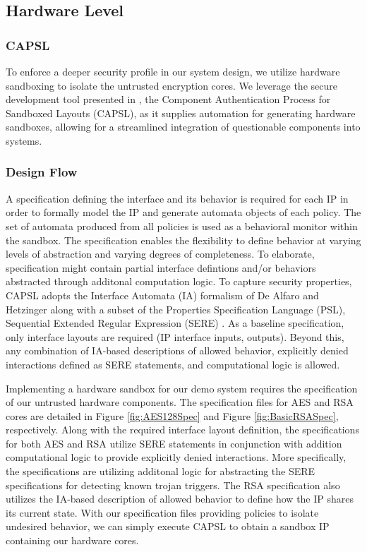 \documentclass[sigconf]{acmart}
\theoremstyle{plain}
\theoremstyle{remark}
\begin{document}
\subsection{Hardware Level}


\subsubsection{CAPSL}

To enforce a deeper security profile in our system design, we utilize hardware sandboxing to isolate the untrusted encryption cores. We leverage the secure development tool presented in \cite{CAPSL}, the Component Authentication Process for Sandboxed Layouts (CAPSL), as it supplies automation for generating hardware sandboxes, allowing for a streamlined integration of questionable components into systems.

\subsubsection{Design Flow}

A specification defining the interface and its behavior is required for each IP in order to formally model the IP and generate automata objects of each policy. The set of automata produced from all policies is used as a behavioral monitor within the sandbox. The specification enables the flexibility to define behavior at varying levels of abstraction and varying degrees of completeness. To elaborate, specification might contain partial interface defintions and/or behaviors abstracted through additonal computation logic. To capture security properties, CAPSL adopts the Interface Automata (IA) formalism of De Alfaro and Hetzinger \cite{deAlfaro} along with a subset of the Properties Specification Language (PSL), Sequential Extended Regular Expression (SERE) \cite{psl}. As a baseline specification, only interface layouts are required (IP interface inputs, outputs). Beyond this, any combination of IA-based descriptions of allowed behavior, explicitly denied interactions defined as SERE statements, and computational logic is allowed.


Implementing a hardware sandbox for our demo system requires the specification of our untrusted hardware components. The specification files for AES and RSA cores are detailed in Figure \ref{fig:AES128Spec} and Figure \ref{fig:BasicRSASpec}, respectively. Along with the required interface layout definition, the specifications for both AES and RSA utilize SERE statements in conjunction with addition computational logic to provide explicitly denied interactions. More specifically, the specifications are utilizing additonal logic for abstracting the SERE specifications for detecting known trojan triggers. The RSA specification also utilizes the IA-based description of allowed behavior to define how the IP shares its current state. With our specification files providing policies to isolate undesired behavior, we can simply execute CAPSL to obtain a sandbox IP containing our hardware cores.
\end{document}
